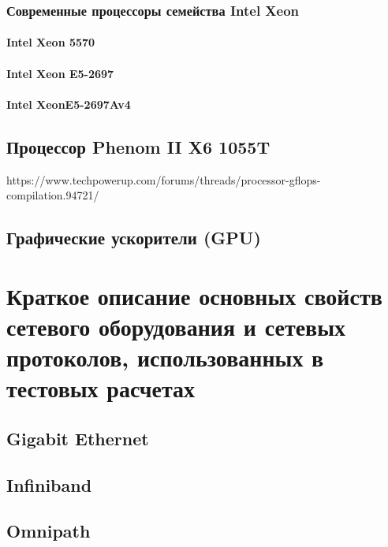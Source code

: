 \subsection{Современные процессоры семейства Intel Xeon}
\subsubsection{Intel Xeon 5570}
\subsubsection{Intel Xeon E5-2697}
\subsubsection{Intel XeonE5-2697Av4}

\section{Процессор Phenom II X6 1055T}
https://www.techpowerup.com/forums/threads/processor-gflops-compilation.94721/
\clearpage
\section{Графические ускорители (GPU)}



\chapter{Краткое описание основных свойств сетевого оборудования и сетевых протоколов, использованных в тестовых расчетах} \label{AppendixB}

\section{Gigabit Ethernet}
\section{Infiniband}
\section{Omnipath}


